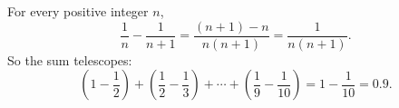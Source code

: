 For every positive integer $n$,
\[
\dfrac{1}{n}-\dfrac{1}{n+1}=\dfrac{(n+1)-n}{n(n+1)}=\dfrac{1}{n(n+1)} .
\]
So the sum telescopes:
\[
\left(1-\dfrac{1}{2}\right)+\left(\dfrac{1}{2}-\dfrac{1}{3}\right)+\cdots+\left(\dfrac{1}{9}-\dfrac{1}{10}\right)=1-\dfrac{1}{10}=\boxed{0.9}.
\]
